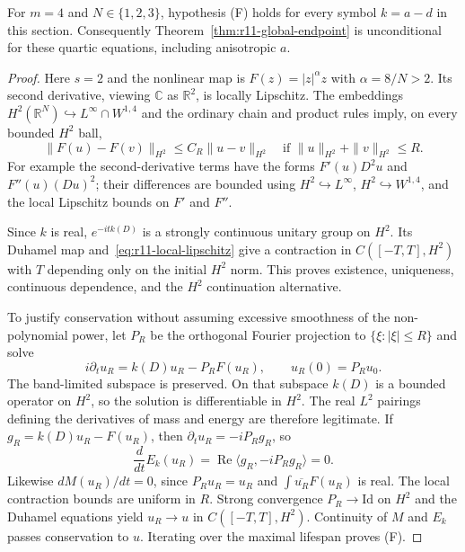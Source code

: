 \begin{proposition}
\label{prop:r11-quartic-local}
For $m=4$ and $N\in\{1,2,3\}$, hypothesis \textup{(F)} holds for
every symbol $k=a-d$ in this section.  Consequently
Theorem~\ref{thm:r11-global-endpoint} is unconditional for these
quartic equations, including anisotropic $a$.
\end{proposition}

\begin{proof}
Here $s=2$ and the nonlinear map is $F(z)=|z|^\alpha z$ with
$\alpha=8/N>2$.  Its second derivative, viewing $\mathbb C$ as
$\mathbb R^2$, is locally Lipschitz.  The embeddings
$H^2(\mathbb R^N)\hookrightarrow L^\infty\cap W^{1,4}$ and the
ordinary chain and product rules imply, on every bounded $H^2$ ball,
\begin{equation}\label{eq:r11-local-lipschitz}
 \|F(u)-F(v)\|_{H^2}\le C_R\|u-v\|_{H^2}
 \quad\text{if }\|u\|_{H^2}+\|v\|_{H^2}\le R.
\end{equation}
For example the second-derivative terms have the forms
$F'(u)D^2u$ and $F''(u)(Du)^2$; their differences are bounded using
$H^2\hookrightarrow L^\infty$, $H^2\hookrightarrow W^{1,4}$,
and the local Lipschitz bounds on $F'$ and $F''$.

Since $k$ is real, $e^{-itk(D)}$ is a strongly continuous unitary group
on $H^2$.  Its Duhamel map and~\eqref{eq:r11-local-lipschitz} give a
contraction in $C([-T,T],H^2)$ with $T$ depending only on the initial
$H^2$ norm.  This proves existence, uniqueness, continuous dependence,
and the $H^2$ continuation alternative.

To justify conservation without assuming excessive smoothness of the
non-polynomial power, let $P_R$ be the orthogonal Fourier projection to
$\{\xi:|\xi|\le R\}$ and solve
\[
 i\partial_tu_R=k(D)u_R-P_RF(u_R),\qquad u_R(0)=P_Ru_0.
\]
The band-limited subspace is preserved.  On that subspace $k(D)$ is a
bounded operator on $H^2$, so the solution is differentiable in $H^2$.
The real $L^2$ pairings defining the derivatives of mass and energy are
therefore legitimate.  If $g_R=k(D)u_R-F(u_R)$, then
$\partial_tu_R=-iP_Rg_R$, so
\[
 \frac{d}{dt}E_k(u_R)
   =\operatorname{Re}\langle g_R,-iP_Rg_R\rangle=0.
\]
Likewise $dM(u_R)/dt=0$, since $P_Ru_R=u_R$ and
$\int\overline{u_R}F(u_R)$ is real.  The local contraction bounds are
uniform in $R$.  Strong convergence $P_R\to\mathrm{Id}$ on $H^2$
and the Duhamel equations yield
$u_R\to u$ in $C([-T,T],H^2)$.  Continuity of $M$ and $E_k$ passes
conservation to $u$.  Iterating over the maximal lifespan proves
\textup{(F)}.
\end{proof}

